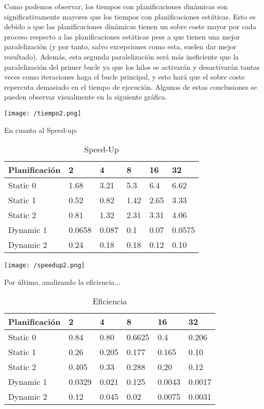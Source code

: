 \documentclass[11pt,oneside,a4paper]{article}
\begin{document}
Como podemos observar, los tiempos con planificaciones dinámicas son significativamente mayores que los tiempos con planificaciones estáticas. Esto es debido a que las planificaciones dinámicas tienen un sobre coste mayor por cada proceso respecto a las planificaciones estáticas pese a que tienen una mejor paralelización (y por tanto, salvo excepciones como esta, suelen dar mejor resultado). Además, esta segunda paralelización será más ineficiente que la paralelización del primer bucle ya que los hilos se activarán y desactivarán tantas veces como iteraciones haga el bucle principal, y esto hará que el sobre coste repercuta demasiado en el tiempo de ejecución. Algunas de estas conclusiones se pueden observar visualmente en la siguiente gráfica.

\texttt{[image: /tiempo2.png]}

En cuanto al Speed-up:

\begin{table}[htbp]
\begin{center}
\begin{tabular}{|l|l||l|l||l||l|}
\hline
Planificación & 2 & 4 & 8 & 16 & 32 \\
\hline 
Static 0 & 1.68 &3.21 &5.3 &6.4 &6.62 \\\hline
Static 1 & 0.52 &0.82 &1.42 &2.65 &3.33  \\\hline
Static 2 & 0.81 &1.32 &2.31 &3.31 &4.06 \\ \hline
Dynamic 1 & 0.0658 &0.087 &0.1 &0.07 &0.0575 \\ \hline
Dynamic 2 & 0.24 &0.18 &0.18 &0.12 &0.10  \\ \hline
\end{tabular}
\caption{Speed-Up}
\label{tabla:speed2}
\end{center}
\end{table}
\texttt{[image: /speedup2.png]}

Por último, analizando la eficiencia...
\begin{table}[htbp]
\begin{center}
\begin{tabular}{|l|l||l|l||l||l|}
\hline
Planificación & 2 & 4 & 8 & 16 & 32 \\
\hline 
Static 0 & 0.84 &0.80 &0.6625 &0.4 &0.206\\\hline
Static 1 & 0.26 &0.205 &0.177 &0.165 &0.10  \\\hline
Static 2 & 0.405 &0.33 &0.288 &0,20 &0.12  \\ \hline
Dynamic 1 & 0.0329 &0.021 &0.125 &0.0043 &0.0017  \\ \hline
Dynamic 2 & 0.12 & 0.045 &0.02 & 0.0075 &0.0031 \\ \hline
\end{tabular}
\caption{Eficiencia}
\label{tabla:eficiencia2}
\end{center}
\end{table}
\end{document}
